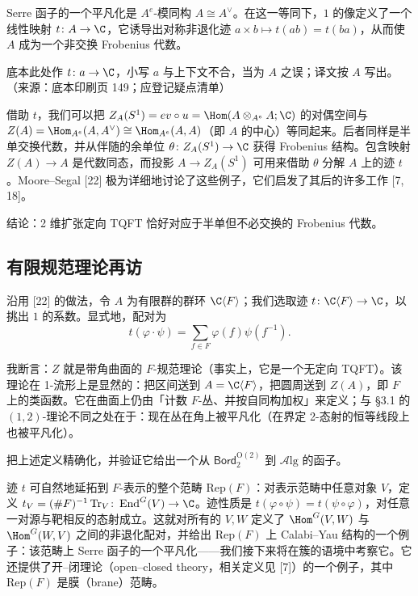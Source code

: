 Serre 函子的一个平凡化是 $A^{e}$-模同构 $A\cong A^{\vee}$。在这一等同下，$1$ 的像定义了一个线性映射 $t\colon A\to\C$，它诱导出对称非退化迹 $a\times b\mapsto t(ab)=t(ba)$，从而使 $A$ 成为一个非交换 Frobenius 代数。\begin{annote}底本此处作 $t\colon a\to\C$，小写 $a$ 与上下文不合，当为 $A$ 之误；译文按 $A$ 写出。（来源：底本印刷页 149；应登记疑点清单）\end{annote}

借助 $t$，我们可以把 $Z_A(S^1)=ev\circ u=\Hom(A\otimes_{A^{e}}A;\C)$ 的对偶空间与 $Z(A)=\Hom_{A^{e}}(A,A^{\vee})\cong\Hom_{A^{e}}(A,A)$（即 $A$ 的中心）等同起来。后者同样是半单交换代数，并从伴随的余单位 $\theta\colon Z_A(S^1)\to\C$ 获得 Frobenius 结构。包含映射 $Z(A)\to A$ 是代数同态，而投影 $A\to Z_A(S^1)$ 可用来借助 $\theta$ 分解 $A$ 上的迹 $t$。Moore--Segal [22] 极为详细地讨论了这些例子，它们启发了其后的许多工作 [7, 18]。

结论：2 维扩张定向 TQFT 恰好对应于半单但不必交换的 Frobenius 代数。

\subsection{有限规范理论再访}

沿用 [22] 的做法，令 $A$ 为有限群的群环 $\C\langle F\rangle$；我们选取迹 $t\colon\C\langle F\rangle\to\C$，以挑出 $1$ 的系数。显式地，配对为
\[
t(\varphi\cdot\psi)=\sum_{f\in F}\varphi(f)\psi(f^{-1}).
\]

我断言：$Z$ 就是带角曲面的 $F$-规范理论（事实上，它是一个无定向 TQFT）。该理论在 1-流形上是显然的：把区间送到 $A=\C\langle F\rangle$，把圆周送到 $Z(A)$，即 $F$ 上的类函数。它在曲面上仍由「计数 $F$-丛、并按自同构加权」来定义；与 §3.1 的 $(1,2)$-理论不同之处在于：现在丛在角上被平凡化（在界定 2-态射的恒等线段上也被平凡化）。

\begin{exercise}
把上述定义精确化，并验证它给出一个从 $\mathsf{Bord}^{\mathrm{O}(2)}_{2}$ 到 $\mathcal{A}\mathrm{lg}$ 的函子。
\end{exercise}

\begin{remark}
迹 $t$ 可自然地延拓到 $F$-表示的整个范畴 $\mathrm{Rep}(F)$：对表示范畴中任意对象 $V$，定义 $t_V=(\#F)^{-1}\operatorname{Tr}_V\colon\operatorname{End}^{G}(V)\to\C$。迹性质是 $t(\varphi\circ\psi)=t(\psi\circ\varphi)$，对任意一对源与靶相反的态射成立。这就对所有的 $V,W$ 定义了 $\Hom^{G}(V,W)$ 与 $\Hom^{G}(W,V)$ 之间的非退化配对，并给出 $\mathrm{Rep}(F)$ 上 Calabi--Yau 结构的一个例子：该范畴上 Serre 函子的一个平凡化——我们接下来将在簇的语境中考察它。它还提供了开–闭理论（open--closed theory，相关定义见 [7]）的一个例子，其中 $\mathrm{Rep}(F)$ 是膜（brane）范畴。
\end{remark}

